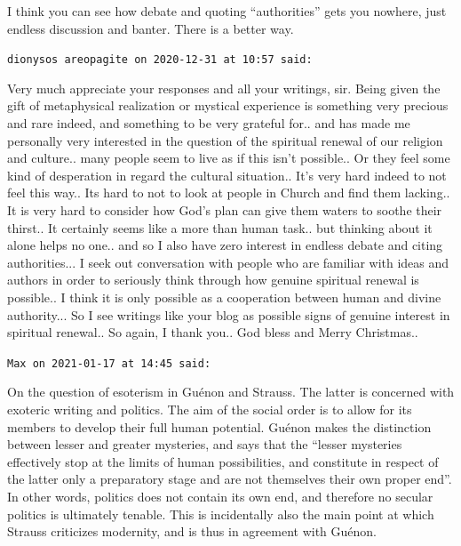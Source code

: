 \begin{footnotesize}
\begin{sffamily}
I think you can see how debate and quoting ``authorities'' gets you nowhere, just endless discussion and banter. There is a better way.

\hfill

\texttt{dionysos areopagite on 2020-12-31 at 10:57 said:}

Very much appreciate your responses and all your writings, sir. Being given the gift of metaphysical realization or mystical experience is something very precious and rare indeed, and something to be very grateful for.. and has made me personally very interested in the question of the spiritual renewal of our religion and culture.. many people seem to live as if this isn't possible.. Or they feel some kind of desperation in regard the cultural situation.. It's very hard indeed to not feel this way.. Its hard to not to look at people in Church and find them lacking.. It is very hard to consider how God's plan can give them waters to soothe their thirst.. It certainly seems like a more than human task.. but thinking about it alone helps no one.. and so I also have zero interest in endless debate and citing authorities... I seek out conversation with people who are familiar with ideas and authors in order to seriously think through how genuine spiritual renewal is possible.. I think it is only possible as a cooperation between human and divine authority... So I see writings like your blog as possible signs of genuine interest in spiritual renewal.. So again, I thank you.. God bless and Merry Christmas..

\hfill

\texttt{Max on 2021-01-17 at 14:45 said:}

On the question of esoterism in Guénon and Strauss. The latter is concerned with exoteric writing and politics. The aim of the social order is to allow for its members to develop their full human potential. Guénon makes the distinction between lesser and greater mysteries, and says that the ``lesser mysteries effectively stop at the limits of human possibilities, and constitute in respect of the latter only a preparatory stage and are not themselves their own proper end''. In other words, politics does not contain its own end, and therefore no secular politics is ultimately tenable. This is incidentally also the main point at which Strauss criticizes modernity, and is thus in agreement with Guénon.


\end{sffamily}
\end{footnotesize}
